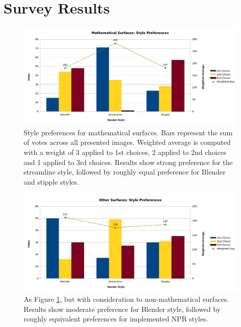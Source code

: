 \FloatBarrier
\section{Survey Results}\label{appendix_eval_results}

\begin{figure}[h!]
	\centering
	\includegraphics[width=\textwidth]{images/eval_chart_styles_math.png}
	\caption{Style preferences for mathematical surfaces. Bars represent the sum of votes across all presented images. Weighted average is computed with a weight of 3 applied to 1st choices, 2 applied to 2nd choices and 1 applied to 3rd choices. Results show strong preference for the streamline style, followed by roughly equal preference for Blender and stipple styles.}\label{eval_chart_styles_math}
\end{figure}

\begin{figure}[h!]
	\centering
	\includegraphics[width=\textwidth]{images/eval_chart_styles_other.png}
	\caption{As Figure \ref{eval_chart_styles_math}, but with consideration to non-mathematical surfaces. Results show moderate preference for Blender style, followed by roughly equivalent preferences for implemented NPR styles.}\label{eval_chart_styles_other}
\end{figure}

